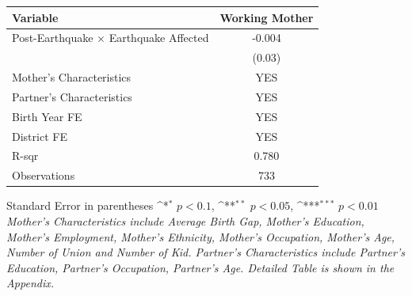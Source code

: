 \def\sym#1{\ifmmode^{#1}\else\(^{#1}\)\fi}
\renewcommand{\arraystretch}{1.4}
\small
\setlength{\tabcolsep}{8pt}

\begin{flushleft}
\begin{tabular}{@{}p{12.5cm}c@{}}
\hline\hline
Variable & Working Mother \\
\hline
Post-Earthquake × Earthquake Affected & -0.004 \\
                                      & (0.03) \\
\hline
Mother's Characteristics              & YES \\
Partner's Characteristics             & YES \\
\hline
Birth Year FE                         & YES \\
District FE                           & YES \\
R-sqr                                 & 0.780 \\
Observations                          & 733 \\
\hline\hline
\end{tabular}

\vspace{4pt}
\noindent\footnotesize
Standard Error in parentheses \sym{*} \(p<0.1\), \sym{**} \(p<0.05\), \sym{***} \(p<0.01\)\\
\textit{Mother’s Characteristics include Average Birth Gap, Mother’s Education, Mother’s Employment, Mother’s Ethnicity, Mother’s Occupation, Mother’s Age, Number of Union and Number of Kid. Partner’s Characteristics include Partner’s Education, Partner’s Occupation, Partner’s Age. Detailed Table is shown in the Appendix.}
\end{flushleft}
